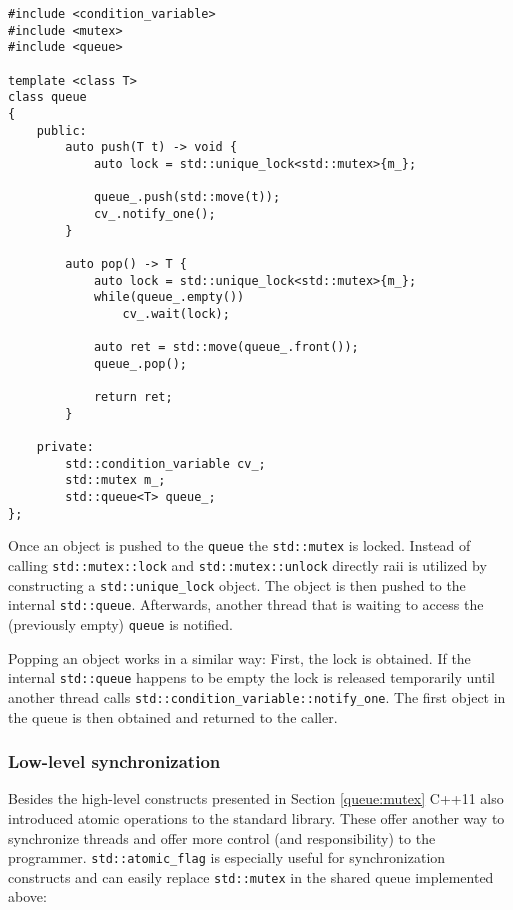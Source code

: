 \begin{lstlisting}
#include <condition_variable>
#include <mutex>
#include <queue>

template <class T>
class queue
{
    public:
        auto push(T t) -> void {
            auto lock = std::unique_lock<std::mutex>{m_};
            
            queue_.push(std::move(t));
            cv_.notify_one();
        }
        
        auto pop() -> T {
            auto lock = std::unique_lock<std::mutex>{m_};
            while(queue_.empty())
                cv_.wait(lock);
                
            auto ret = std::move(queue_.front());
            queue_.pop();
            
            return ret;
        }
        
    private:
        std::condition_variable cv_;
        std::mutex m_;
        std::queue<T> queue_;
};
\end{lstlisting}

Once an object is pushed to the \texttt{queue} the \texttt{std::mutex} is locked. Instead of calling \texttt{std::mutex::lock} and \texttt{std::mutex::unlock} directly \gls{raii} is utilized by constructing a \texttt{std::unique\_lock} object. The object is then pushed to the internal \texttt{std::queue}. Afterwards, another thread that is waiting to access the (previously empty) \texttt{queue} is notified.

Popping an object works in a similar way: First, the lock is obtained. If the internal \texttt{std::queue} happens to be empty the lock is released temporarily until another thread calls \texttt{std::condition\_variable::notify\_one}. The first object in the queue is then obtained and returned to the caller.

\subsubsection{Low-level synchronization}

Besides the high-level constructs presented in Section \ref{queue:mutex} C++11 also introduced atomic operations to the standard library. These offer another way to synchronize threads and offer more control (and responsibility) to the programmer. \texttt{std::atomic\_flag} is especially useful for synchronization constructs and can easily replace \texttt{std::mutex} in the shared queue implemented above:

